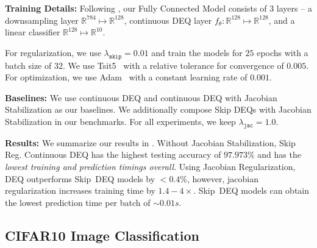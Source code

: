 \textbf{Training Details:} Following \citet{kelly2020learning}, our Fully Connected Model consists of 3 layers -- a downsampling layer $\mathbb{R}^{784} \mapsto \mathbb{R}^{128}$, continuous DEQ layer $f_\theta: \mathbb{R}^{128} \mapsto \mathbb{R}^{128}$, and a linear classifier $\mathbb{R}^{128} \mapsto \mathbb{R}^{10}$.

For regularization, we use $\lambda_{\texttt{skip}} = 0.01$ and train the models for $25$ epochs with a batch size of $32$. We use Tsit5~\citep{tsitouras2011runge} with a relative tolerance for convergence of $0.005$. For optimization, we use Adam~\citep{kingma2014adam} with a constant learning rate of $0.001$.

\textbf{Baselines:} We use continuous DEQ and continuous DEQ with Jacobian Stabilization as our baselines. We additionally compose Skip DEQs with Jacobian Stabilization in our benchmarks. For all experiments, we keep $\lambda_{\texttt{jac}} = 1.0$.

\textbf{Results:} We summarize our results in . Without Jacobian Stabilization, Skip Reg. Continuous DEQ has the highest testing accuracy of $\mathit{97.973\%}$ and has the \textit{lowest training and prediction timings overall}. Using Jacobian Regularization, DEQ outperforms Skip~DEQ models by $\mathit{< 0.4\%}$, however, jacobian regularization increases training time by $\mathit{1.4 - 4}\times$. Skip~DEQ models can obtain the lowest prediction time per batch of $\mathit{\sim0.01s}$.

\subsection{CIFAR10 Image Classification}
\label{subsec:infinite_time_neural_odes_cifar10_image_classification}


